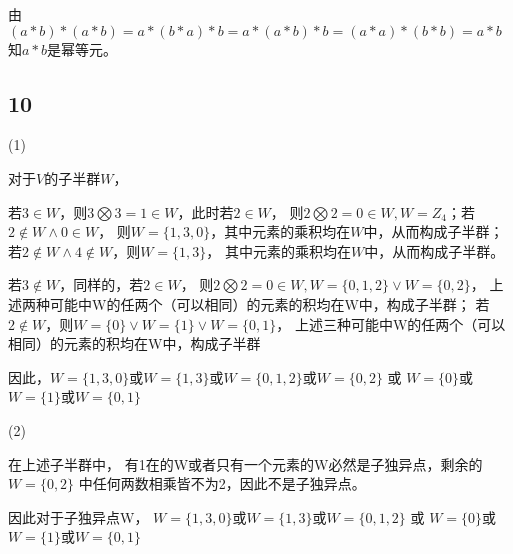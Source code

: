 \documentclass[UTF8]{ctexart}
\begin{document}
由$(a*b)*(a*b) = a*(b*a)*b = a*(a*b)*b = (a*a)*(b*b) = a*b$
知$a*b$是幂等元。

\subsection*{10}

(1)

对于$V$的子半群$W$，

若$3\in W$，则$3\bigotimes 3 = 1\in W$，此时若$2\in W$，
则$2\bigotimes 2 = 0\in W, W=Z_4$；若$2\notin W\land 0\in W$，
则$W=\{1, 3, 0\}$，其中元素的乘积均在$W$中，从而构成子半群；
若$2\notin W\land 4\notin W$，则$W = \{1, 3\}$，
其中元素的乘积均在$W$中，从而构成子半群。

若$3\notin W$，同样的，若$2\in W$，
则$2\bigotimes 2 = 0\in W, W=\{0, 1, 2\}\lor W = \{0, 2\}$，
上述两种可能中W的任两个（可以相同）的元素的积均在W中，构成子半群；
若$2\notin W$，则$W=\{0\}\lor W=\{1\}\lor W=\{0, 1\}$，
上述三种可能中W的任两个（可以相同）的元素的积均在W中，构成子半群

因此，$W = \{1, 3, 0\}$或$W = \{1, 3\}$或$W = \{0, 1, 2\}$或$W = \{0, 2\}$ 或
$W=\{0\}$或$W=\{1\}$或$W=\{0, 1\}$

(2)

在上述子半群中，
有1在的W或者只有一个元素的W必然是子独异点，剩余的$W = \{0, 2\}$
中任何两数相乘皆不为2，因此不是子独异点。

因此对于子独异点W，
$W = \{1, 3, 0\}$或$W = \{1, 3\}$或$W = \{0, 1, 2\}$ 或
$W=\{0\}$或$W=\{1\}$或$W=\{0, 1\}$
\end{document}
